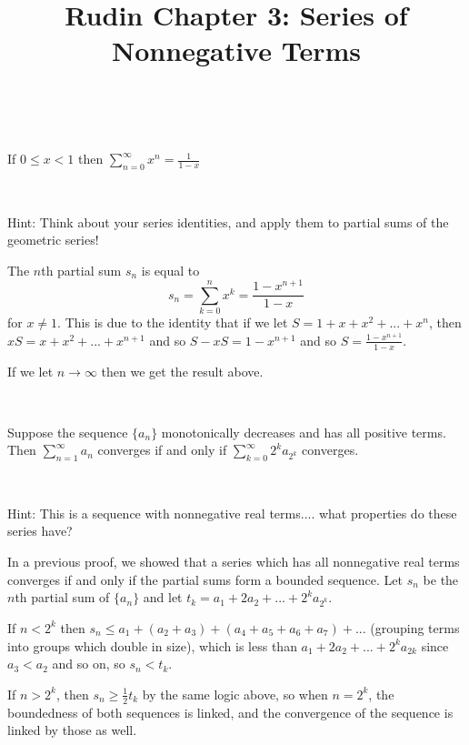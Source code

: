 \documentclass{article}
\title{Rudin Chapter 3: Series of Nonnegative Terms}
\begin{document}
\maketitle

\begin{theorem}
\

If $0 \leq x < 1$ then $\sum_{n=0}^\infty x^n = \frac{1}{1-x}$
\end{theorem}

\begin{customproof}
\

Hint: Think about your series identities, and apply them to partial sums of the geometric series!

The $n$th partial sum $s_n$ is equal to $$s_n = \sum_{k=0}^n x^k = \frac{1-x^{n+1}}{1-x}$$for $x \neq 1$. This is due to the identity that if we let $S = 1 + x + x^2 + ... + x^n$, then $xS = x + x^2 + ... + x^{n+1}$ and so $S - xS = 1- x^{n+1}$ and so $S = \frac{1 - x^{n+1}}{1-x}$.

If we let $n\to \infty$ then we get the result above.
\end{customproof}


\begin{theorem}
\

Suppose the sequence $\{a_n\}$ monotonically decreases and has all positive terms. Then $\sum_{n=1}^\infty a_n$ converges if and only if $\sum_{k=0}^\infty 2^k a_{2^k}$ converges.
\end{theorem}

\begin{customproof}
\

Hint: This is a sequence with nonnegative real terms.... what properties do these series have?

In a previous proof, we showed that a series which has all nonnegative real terms converges if and only if the partial sums form a bounded sequence. Let $s_n$ be the $n$th partial sum of $\{a_n\}$ and let $t_k = a_1 + 2a_2 + ... + 2^ka_{2^k}$.

If $n < 2^k$ then $s_n \leq a_1 + (a_2 + a_3) + (a_4 + a_5 + a_6 + a_7) + ...$ (grouping terms into groups which double in size), which is less than $a_1 + 2a_2 + ... + 2^k a_{2k}$ since $a_3 < a_2$ and so on, so $s_n < t_k$.

If $n > 2^k$, then $s_n \geq \frac{1}{2} t_k$ by the same logic above, so when $n = 2^k$, the boundedness of both sequences is linked, and the convergence of the sequence is linked by those as well.
\end{customproof}
\end{document}

